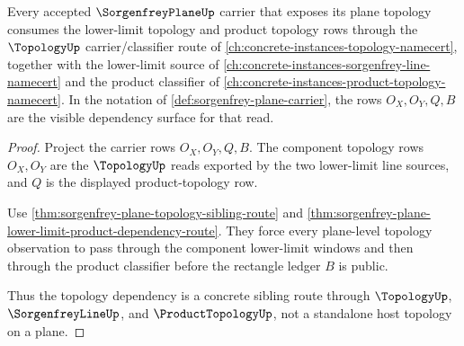 \begin{theorem}
\label{thm:sorgenfrey-plane-topology-dependency}
Every accepted $\SorgenfreyPlaneUp$ carrier that exposes its plane topology consumes the lower-limit topology and product topology rows through the $\TopologyUp$ carrier/classifier route of \autoref{ch:concrete-instances-topology-namecert}, together with the lower-limit source of \autoref{ch:concrete-instances-sorgenfrey-line-namecert} and the product classifier of \autoref{ch:concrete-instances-product-topology-namecert}. In the notation of \autoref{def:sorgenfrey-plane-carrier}, the rows $O_X,O_Y,Q,B$ are the visible dependency surface for that read.
\end{theorem}
\begin{proof}
Project the carrier rows $O_X,O_Y,Q,B$. The component topology rows $O_X,O_Y$ are the $\TopologyUp$ reads exported by the two lower-limit line sources, and $Q$ is the displayed product-topology row.

Use \autoref{thm:sorgenfrey-plane-topology-sibling-route} and \autoref{thm:sorgenfrey-plane-lower-limit-product-dependency-route}. They force every plane-level topology observation to pass through the component lower-limit windows and then through the product classifier before the rectangle ledger $B$ is public.

Thus the topology dependency is a concrete sibling route through $\TopologyUp$, $\SorgenfreyLineUp$, and $\ProductTopologyUp$, not a standalone host topology on a plane.
\end{proof}
